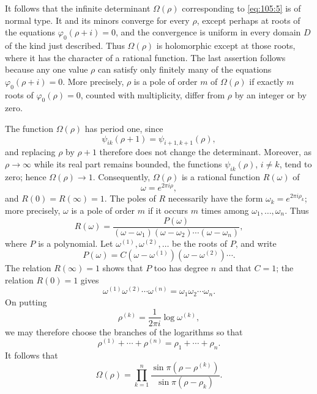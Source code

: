 \documentclass[
  paper=b5,
  fontsize=13pt,
  twoside=true,
  open=any,
  bookmarkpackage=false,
  chapterprefix=true,
  headings=normal
]{scrbook}
\theoremstyle{definition}
\begin{document}
It follows that the infinite determinant \(\Omega(\rho)\) corresponding to
\eqref{eq:105:5} is of normal type.  It and its minors converge for every
\(\rho\), except perhaps at roots of the equations
\(\varphi_0(\rho+i)=0\), and the convergence is uniform in every domain \(D\)
of the kind just described.  Thus \(\Omega(\rho)\) is holomorphic except at
those roots, where it has the character of a rational function.  The last
assertion follows because any one value \(\rho\) can satisfy only finitely many
of the equations \(\varphi_0(\rho+i)=0\).  More precisely, \(\rho\) is a pole
of order \(m\) of \(\Omega(\rho)\) if exactly \(m\) roots of
\(\varphi_0(\rho)=0\), counted with multiplicity, differ from \(\rho\) by an
integer or by zero.

The function \(\Omega(\rho)\) has period one, since
\[
  \psi_{ik}(\rho+1)=\psi_{i+1,k+1}(\rho),
\]
and replacing \(\rho\) by \(\rho+1\) therefore does not change the
determinant.  Moreover, as \(\rho\to\infty\) while its real part remains
bounded, the functions \(\psi_{ik}(\rho)\), \(i\ne k\), tend to zero; hence
\(\Omega(\rho)\to1\).  Consequently, \(\Omega(\rho)\) is a rational function
\(R(\omega)\) of
\[
  \omega=e^{2\pi i\rho},
\]
and \(R(0)=R(\infty)=1\).  The poles of \(R\) necessarily have the form
\(\omega_k=e^{2\pi i\rho_k}\); more precisely, \(\omega\) is a pole of order
\(m\) if it occurs \(m\) times among \(\omega_1,\ldots,\omega_n\).  Thus
\[
  R(\omega)=\frac{P(\omega)}
  {(\omega-\omega_1)(\omega-\omega_2)\cdots(\omega-\omega_n)},
\]
where \(P\) is a polynomial.  Let
\(\omega^{(1)},\omega^{(2)},\ldots\)
be the roots of \(P\), and write
\[
  P(\omega)=C(\omega-\omega^{(1)})(\omega-\omega^{(2)})\cdots.
\]
The relation \(R(\infty)=1\) shows that \(P\) too has degree \(n\) and that
\(C=1\); the relation \(R(0)=1\) gives
\[
  \omega^{(1)}\omega^{(2)}\cdots\omega^{(n)}
  =\omega_1\omega_2\cdots\omega_n.
\]
On putting
\[
  \rho^{(k)}=\frac1{2\pi i}\log\omega^{(k)},
\]
we may therefore choose the branches of the logarithms so that
\[
  \rho^{(1)}+\cdots+\rho^{(n)}=\rho_1+\cdots+\rho_n.
\]
It follows that
\[
  \Omega(\rho)=\prod_{k=1}^{n}
  \frac{\sin\pi(\rho-\rho^{(k)})}{\sin\pi(\rho-\rho_k)}.
\]
\end{document}
